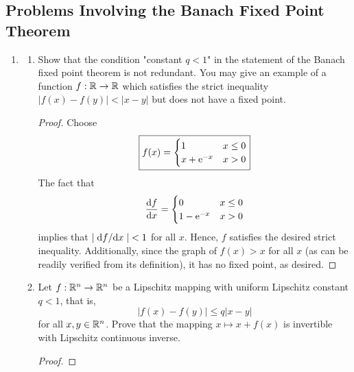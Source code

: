 \documentclass[../psets.tex]{subfiles}
\begin{document}
\subsection*{Problems Involving the Banach Fixed Point Theorem}
\begin{enumerate}
    \item 
    \begin{enumerate}
        \item Show that the condition "constant $q<1$" in the statement of the Banach fixed point theorem is not redundant. You may give an example of a function $f:\R\to\R$ which satisfies the strict inequality $|f(x)-f(y)|<|x-y|$ but does not have a fixed point.
        \begin{proof}
            Choose
            \begin{equation*}
                \boxed{
                    f(x) =
                    \begin{cases}
                        1 & x\leq 0\\
                        x+\e[-x] & x>0
                    \end{cases}
                }
            \end{equation*}
            The fact that
            \begin{equation*}
                \dv{f}{x} =
                \begin{cases}
                    0 & x\leq 0\\
                    1-\e[-x] & x>0
                \end{cases}
            \end{equation*}
            implies that $|\dv*{f}{x}|<1$ for all $x$. Hence, $f$ satisfies the desired strict inequality. Additionally, since the graph of $f(x)>x$ for all $x$ (as can be readily verified from its definition), it has no fixed point, as desired.
        \end{proof}
        \item Let $f:\R^n\to\R^n$ be a Lipschitz mapping with uniform Lipschitz constant $q<1$, that is,
        \begin{equation*}
            |f(x)-f(y)| \leq q|x-y|
        \end{equation*}
        for all $x,y\in\R^n$. Prove that the mapping $x\mapsto x+f(x)$ is invertible with Lipschitz continuous inverse.
        \begin{proof}


\end{proof}
\end{enumerate}
\end{enumerate}
\end{document}
